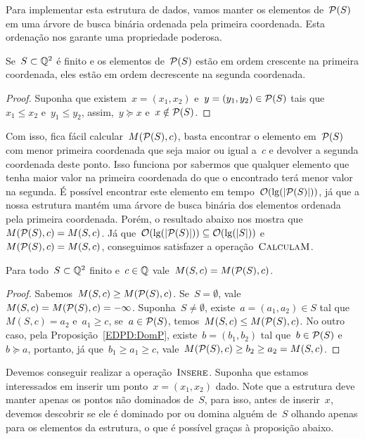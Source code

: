 Para implementar esta estrutura de dados, vamos manter os elementos de~$\mathcal{P}(S)$ em uma árvore de busca binária ordenada pela primeira coordenada. Esta ordenação nos garante uma propriedade poderosa.

\begin{prop} \label{EDPD:doubleorder}
Se~$S \subset \mathbb{Q}^2$ é finito e os elementos de~$\mathcal{P}(S)$ estão em ordem crescente na primeira coordenada, eles estão em ordem decrescente na segunda coordenada.
\end{prop}
\begin{proof}
Suponha que existem~$x = (x_1,x_2)$ e~$y = (y_1,y_2) \in \mathcal{P}(S)$ tais que~$x_1 \leq x_2$ e~$y_1 \leq y_2$, assim,~$y \succeq x$ e~$x \notin \mathcal{P}(S)$.
\end{proof}

Com isso, fica fácil calcular~$M(\mathcal{P}(S),c)$, basta encontrar o elemento em~$\mathcal{P}(S)$ com menor primeira coordenada que seja maior ou igual a~$c$ e devolver a segunda coordenada deste ponto. Isso funciona por sabermos que qualquer elemento que tenha maior valor na primeira coordenada do que o encontrado terá menor valor na segunda. É possível encontrar este elemento em tempo~$\mathcal{O}(\lg(|\mathcal{P}(S)|))$, já que a nossa estrutura mantém uma árvore de busca binária dos elementos ordenada pela primeira coordenada. Porém, o resultado abaixo nos mostra que~$M(\mathcal{P}(S),c) = M(S,c)$. Já que~${\mathcal{O}(\lg(|\mathcal{P}(S)|)) \subseteq \mathcal{O}(\lg(|S|))}$ e~$M(\mathcal{P}(S),c) = M(S,c)$, conseguimos satisfazer a operação~$\textsc{CalculaM}$.

\begin{prop}
Para todo~$S \subset \mathbb{Q}^2$ finito e~$c \in \mathbb{Q}$ vale~$M(S,c) = M(\mathcal{P}(S),c)$.
\end{prop}
\begin{proof}
Sabemos~$M(S,c) \geq M(\mathcal{P}(S),c)$. Se~$S = \emptyset$, vale~${M(S,c) = M(\mathcal{P}(S),c) = -\infty}$. Suponha~$S \neq \emptyset$, existe~$a=(a_1,a_2) \in S$ tal que~$M(S,c) = a_2$ e~$a_1 \geq c$, se~$a \in \mathcal{P}(S)$, temos~${M(S,c) \leq M(\mathcal{P}(S),c)}$. No outro caso, pela Proposição~\ref{EDPD:DomP}, existe~$b =(b_1,b_2)$ tal que~$b \in \mathcal{P}(S)$ e~$b \succeq a$, portanto, já que~$b_1 \geq a_1 \geq c$, vale~$M(\mathcal{P}(S),c) \geq b_2 \geq a_2 = M(S,c)$.
\end{proof}

Devemos conseguir realizar a operação~$\textsc{Insere}$. Suponha que estamos interessados em inserir um ponto~$x = (x_1,x_2)$ dado. Note que a estrutura deve manter apenas os pontos não dominados de~$S$, para isso, antes de inserir~$x$, devemos descobrir se ele é dominado por ou domina alguém de~$S$ olhando apenas para os elementos da estrutura, o que é possível graças à proposição abaixo.

